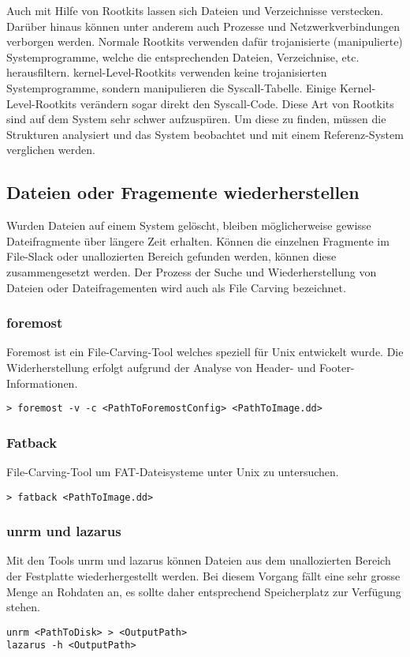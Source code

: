 Auch mit Hilfe von Rootkits lassen sich Dateien und Verzeichnisse verstecken. Darüber hinaus können unter anderem auch Prozesse und Netzwerkverbindungen verborgen werden. Normale Rootkits verwenden dafür trojanisierte (manipulierte) Systemprogramme, welche die entsprechenden Dateien, Verzeichnise, etc. herausfiltern. kernel-Level-Rootkits verwenden keine trojanisierten Systemprogramme, sondern manipulieren die Syscall-Tabelle. Einige Kernel-Level-Rootkits verändern sogar direkt den Syscall-Code. Diese Art von Rootkits sind auf dem System sehr schwer aufzuspüren. Um diese zu finden, müssen die Strukturen analysiert und das System beobachtet und mit einem Referenz-System verglichen werden.



\subsection{Dateien oder Fragemente wiederherstellen}
Wurden Dateien auf einem System gelöscht, bleiben möglicherweise gewisse Dateifragmente über längere Zeit erhalten. Können die einzelnen Fragmente im File-Slack oder unallozierten Bereich gefunden werden, können diese zusammengesetzt werden. Der Prozess der Suche und Wiederherstellung von Dateien oder Dateifragementen wird auch als File Carving bezeichnet.

\subsubsection{foremost}
Foremost ist ein File-Carving-Tool welches speziell für Unix entwickelt wurde. Die Widerherstellung erfolgt aufgrund der Analyse von Header- und Footer-Informationen.

\begin{lstlisting}
> foremost -v -c <PathToForemostConfig> <PathToImage.dd>
\end{lstlisting}


\subsubsection{Fatback}
File-Carving-Tool um FAT-Dateisysteme unter Unix zu untersuchen.

\begin{lstlisting}
> fatback <PathToImage.dd>
\end{lstlisting}


\subsubsection{unrm und lazarus}
Mit den Tools unrm und lazarus können Dateien aus dem unallozierten Bereich der Festplatte wiederhergestellt werden. Bei diesem Vorgang fällt eine sehr grosse Menge an Rohdaten an, es sollte daher entsprechend Speicherplatz zur Verfügung stehen.
\begin{lstlisting}
unrm <PathToDisk> > <OutputPath>
lazarus -h <OutputPath>
\end{lstlisting}


